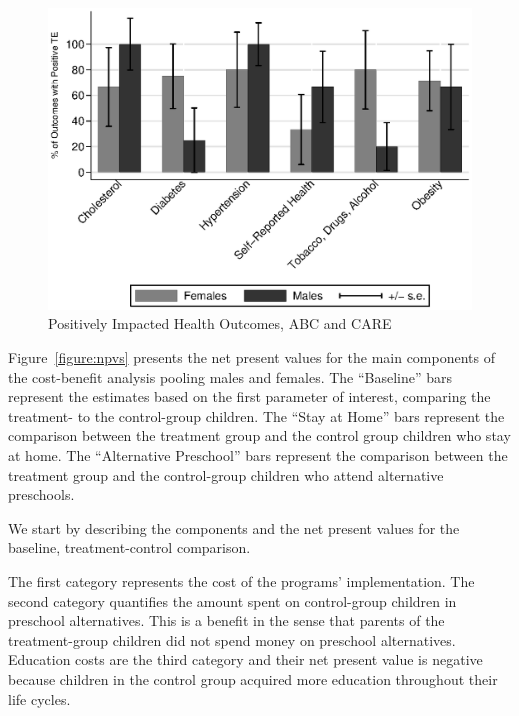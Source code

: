 \begin{figure}[H]
		\caption{Positively Impacted Health Outcomes, ABC and CARE} \label{fig:ppositivecategory2}
		\includegraphics[width=.78\columnwidth]{output/itt_noctrl_cats2.eps}
\end{figure}

Figure~\ref{figure:npvs} presents the net present values for the main components of the cost-benefit analysis pooling males and females. The ``Baseline'' bars represent the estimates based on the first parameter of interest, comparing the treatment- to the control-group children. The ``Stay at Home'' bars represent the comparison between the treatment group and the control group children who stay at home. The ``Alternative Preschool'' bars represent the comparison between the treatment group and the control-group children who attend alternative preschools.

We start by describing the components and the net present values for the baseline, treatment-control comparison.

The first category represents the cost of the programs' implementation. The second category quantifies the amount spent on control-group children in preschool alternatives. This is a benefit in the sense that parents of the treatment-group children did not spend money on preschool alternatives. Education costs are the third category and their net present value is negative because children in the control group acquired more education throughout their life cycles.

